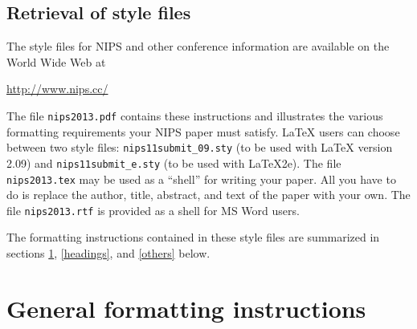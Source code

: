 \documentclass{article} %
\begin{document}
\subsection{Retrieval of style files}

The style files for NIPS and other conference information are available on the World Wide Web at
\begin{center}
   \url{http://www.nips.cc/}
\end{center}
The file \verb+nips2013.pdf+ contains these
instructions and illustrates the
various formatting requirements your NIPS paper must satisfy. \LaTeX{}
users can choose between two style files:
\verb+nips11submit_09.sty+ (to be used with \LaTeX{} version 2.09) and
\verb+nips11submit_e.sty+ (to be used with \LaTeX{}2e). The file
\verb+nips2013.tex+ may be used as a ``shell'' for writing your paper. All you
have to do is replace the author, title, abstract, and text of the paper with
your own. The file
\verb+nips2013.rtf+ is provided as a shell for MS Word users.

The formatting instructions contained in these style files are summarized in
sections \ref{gen_inst}, \ref{headings}, and \ref{others} below.




\section{General formatting instructions}
\label{gen_inst}
\end{document}
